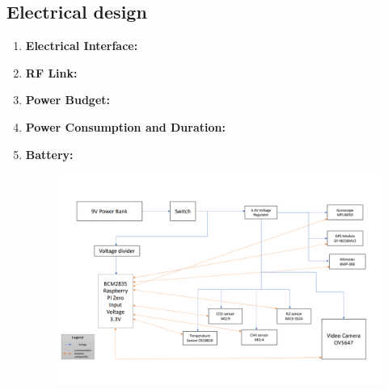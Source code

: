 \documentclass[11pt]{article}
\begin{document}
\subsection{Electrical design}
\begin{enumerate}
\item \textbf{Electrical Interface:}
\item \textbf{RF Link:}
\item \textbf{Power Budget:}
\item \textbf{Power Consumption and Duration:}
\item \textbf{Battery:} 

\begin{figure}[hbt!]
\includegraphics[width=15cm]{Schema_electrica}
\centering
\end{figure}
\end{enumerate}
\end{document}
